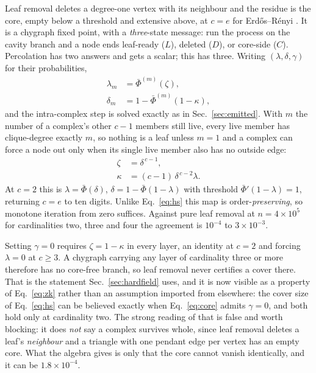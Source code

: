 \documentclass[aps,pre,twocolumn,superscriptaddress,floatfix]{revtex4-2}
\begin{document}
Leaf removal deletes a degree-one vertex with its neighbour and the residue is
the core, empty below a threshold and extensive above, at $c=e$ for
Erd\H{o}s--R\'enyi \cite{BG01}. It is a chygraph fixed point, with a
\emph{three}-state message: run the process on the cavity branch and a node ends
leaf-ready ($L$), deleted ($D$), or core-side ($C$). Percolation has two answers
and gets a scalar; this has three. Writing $(\lambda,\delta,\gamma)$ for their
probabilities,
\begin{equation}
  \begin{split}
    \lambda_m&=\bar\Phi^{(m)}(\zeta),\\
    \delta_m&=1-\bar\Phi^{(m)}(1-\kappa),
  \end{split}
  \label{eq:core}
\end{equation}
and the intra-complex step is solved exactly as in Sec.~\ref{sec:emitted}. With
$m$ the number of a complex's other $c-1$ members still live, every live member
has clique-degree exactly $m$, so nothing is a leaf unless $m=1$ and a complex
can force a node out only when its single live member also has no outside edge:
\begin{equation}
  \begin{split}
    \zeta&=\delta^{\,c-1},\\
    \kappa&=(c-1)\,\delta^{\,c-2}\lambda.
  \end{split}
  \label{eq:zk}
\end{equation}
At $c=2$ this is $\lambda=\bar\Phi(\delta)$, $\delta=1-\bar\Phi(1-\lambda)$
with threshold $\bar\Phi'(1-\lambda)=1$, returning $c=e$ to ten digits. Unlike
Eq.~\eqref{eq:hs} this map is order-\emph{preserving}, so monotone iteration
from zero suffices. Against pure leaf removal at $n=4\times10^5$ for
cardinalities two, three and four the agreement is $10^{-4}$ to
$3\times10^{-3}$.

Setting $\gamma=0$ requires $\zeta=1-\kappa$ in every layer, an identity at
$c=2$ and forcing $\lambda=0$ at $c\geq3$. A chygraph carrying any layer of
cardinality three or more therefore has no core-free branch, so leaf removal
never certifies a cover there. That is the statement Sec.~\ref{sec:hardfield}
uses, and it is now visible as a property of Eq.~\eqref{eq:zk} rather than an
assumption imported from elsewhere: the cover size of Eq.~\eqref{eq:hs} can be
believed exactly when Eq.~\eqref{eq:core} admits $\gamma=0$, and both hold only
at cardinality two. The strong reading of that is false and worth blocking: it does \emph{not}
say a complex survives whole, since leaf removal deletes a leaf's
\emph{neighbour} and a triangle with one pendant edge per vertex has an empty
core. What the algebra gives is only that the core cannot vanish identically,
and it can be $1.8\times10^{-4}$.
\end{document}
